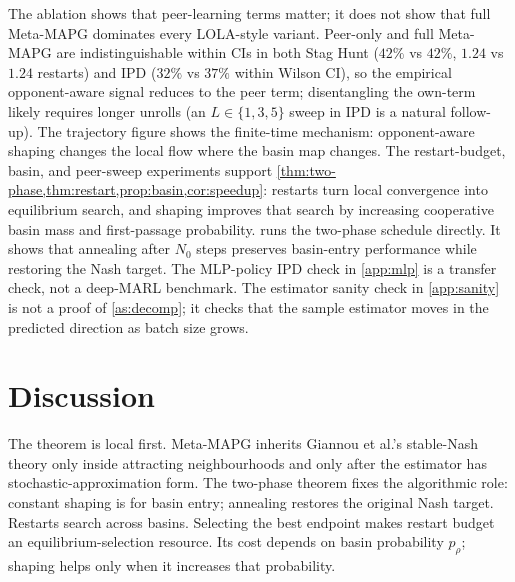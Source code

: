 \documentclass{article}
\theoremstyle{plain}
\theoremstyle{definition}
\theoremstyle{remark}
\begin{document}
\begin{table}[t]
  \centering
  \caption{Main 100-seed summary. Cooperative success uses a minimum initial-state cooperation threshold of $0.82$. Restart success and mean restarts are reported for all methods using paired restart initialisations.}
  \label{tab:results}
  \resizebox{\linewidth}{!}{}
\end{table}

The ablation shows that peer-learning terms matter; it does not show that full Meta-MAPG dominates every LOLA-style variant. Peer-only and full Meta-MAPG are indistinguishable within CIs in both Stag Hunt ($42\%$ vs $42\%$, $1.24$ vs $1.24$ restarts) and IPD ($32\%$ vs $37\%$ within Wilson CI), so the empirical opponent-aware signal reduces to the peer term; disentangling the own-term likely requires longer unrolls (an $L\in\{1,3,5\}$ sweep in IPD is a natural follow-up). The trajectory figure shows the finite-time mechanism: opponent-aware shaping changes the local flow where the basin map changes. The restart-budget, basin, and peer-sweep experiments support \cref{thm:two-phase,thm:restart,prop:basin,cor:speedup}: restarts turn local convergence into equilibrium search, and shaping improves that search by increasing cooperative basin mass and first-passage probability.  runs the two-phase schedule directly. It shows that annealing after $N_0$ steps preserves basin-entry performance while restoring the Nash target. The MLP-policy IPD check in \cref{app:mlp} is a transfer check, not a deep-MARL benchmark. The estimator sanity check in \cref{app:sanity} is not a proof of \cref{as:decomp}; it checks that the sample estimator moves in the predicted direction as batch size grows.

\section{Discussion}

The theorem is local first. Meta-MAPG inherits Giannou et al.'s stable-Nash theory only inside attracting neighbourhoods and only after the estimator has stochastic-approximation form. The two-phase theorem fixes the algorithmic role: constant shaping is for basin entry; annealing restores the original Nash target. Restarts search across basins. Selecting the best endpoint makes restart budget an equilibrium-selection resource. Its cost depends on basin probability $p_\rho$; shaping helps only when it increases that probability.
\end{document}

